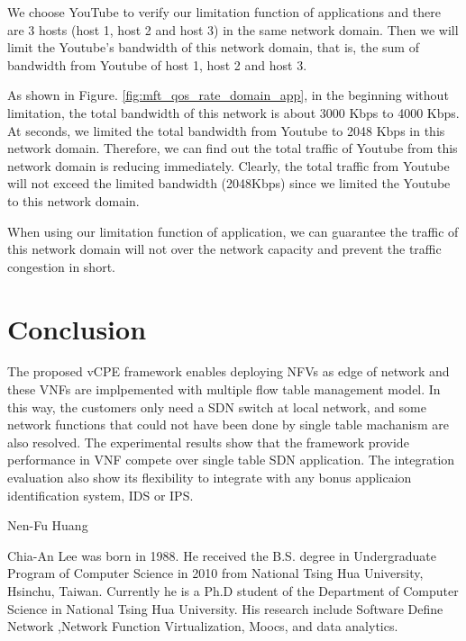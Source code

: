 \documentclass[journal]{IEEEtran}
\begin{document}
We choose YouTube to verify our limitation function of applications and there are 3 hosts (host 1, host 2 and host 3) in the same network domain. Then we will limit the Youtube’s bandwidth of this network domain, that is, the sum of bandwidth from Youtube of host 1, host 2 and host 3.

As shown in Figure. \ref{fig:mft_qos_rate_domain_app}, in the beginning without limitation, the total bandwidth of this network is about 3000 Kbps to 4000 Kbps. At  seconds, we limited the total bandwidth from Youtube to 2048 Kbps in this network domain. Therefore, we can find out the total traffic of Youtube from this network domain is reducing immediately. Clearly, the total traffic from Youtube will not exceed the limited bandwidth (2048Kbps) since we limited the Youtube to this network domain.

When using our limitation function of application, we can guarantee the traffic of this network domain will not over the network capacity and prevent the traffic congestion in short.



\section{Conclusion}
The proposed vCPE framework enables deploying NFVs as edge of network and these VNFs are implpemented with multiple flow table management model. In this way, the customers only need a SDN switch at local network, and some network functions that could not have been done by single table machanism are also resolved. The experimental results show that the framework provide performance in VNF compete over single table SDN application. The integration evaluation also show its flexibility to integrate with any bonus applicaion identification system, IDS or IPS.



\newpage



\begin{IEEEbiography}
{Nen-Fu Huang}
\end{IEEEbiography}

\begin{IEEEbiography}
{Chia-An Lee} was born in 1988. He received the B.S. degree in Undergraduate Program of Computer Science in 2010 from National Tsing Hua University, Hsinchu, Taiwan.
Currently he is a Ph.D student of the Department of Computer Science in National Tsing Hua University.
His research include Software Define Network ,Network Function Virtualization, Moocs, and data analytics.
\end{IEEEbiography}
\end{document}
